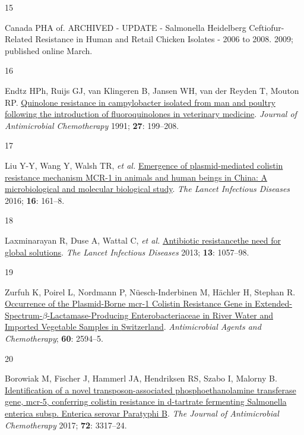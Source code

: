 \documentclass[
]{book}
\newlength{\cslhangindent}
\newlength{\csllabelwidth}
\newlength{\cslentryspacingunit} %
\newenvironment{CSLReferences}[2] %
 {%
  \setlength{\parindent}{0pt}
  \ifodd #1
  \let\oldpar\par
  \def\par{\hangindent=\cslhangindent\oldpar}
  \fi
  \setlength{\parskip}{#2\cslentryspacingunit}
 }%
 {}
\newcommand{\CSLLeftMargin}[1]{\parbox[t]{\csllabelwidth}{#1}}
\newcommand{\CSLRightInline}[1]{\parbox[t]{\linewidth - \csllabelwidth}{#1}\break}
\begin{document}
\begin{CSLReferences}{0}{0}
\leavevmode{}%
\CSLLeftMargin{15 }
\CSLRightInline{Canada PHA of. {ARCHIVED} - {UPDATE} - {Salmonella Heidelberg Ceftiofur-Related Resistance} in {Human} and {Retail Chicken Isolates} - 2006 to 2008. 2009; published online March.}

\leavevmode{}%
\CSLLeftMargin{16 }
\CSLRightInline{Endtz HPh, Ruijs GJ, van Klingeren B, Jansen WH, van der Reyden T, Mouton RP. \href{https://doi.org/10.1093/jac/27.2.199}{Quinolone resistance in campylobacter isolated from man and poultry following the introduction of fluoroquinolones in veterinary medicine}. \emph{Journal of Antimicrobial Chemotherapy} 1991; \textbf{27}: 199--208.}

\leavevmode{}%
\CSLLeftMargin{17 }
\CSLRightInline{Liu Y-Y, Wang Y, Walsh TR, \emph{et al.} \href{https://doi.org/10.1016/S1473-3099(15)00424-7}{Emergence of plasmid-mediated colistin resistance mechanism {MCR-1} in animals and human beings in {China}: A microbiological and molecular biological study}. \emph{The Lancet Infectious Diseases} 2016; \textbf{16}: 161--8.}

\leavevmode{}%
\CSLLeftMargin{18 }
\CSLRightInline{Laxminarayan R, Duse A, Wattal C, \emph{et al.} \href{https://doi.org/10.1016/S1473-3099(13)70318-9}{Antibiotic resistance\textemdash the need for global solutions}. \emph{The Lancet Infectious Diseases} 2013; \textbf{13}: 1057--98.}

\leavevmode{}%
\CSLLeftMargin{19 }
\CSLRightInline{Zurfuh K, Poirel L, Nordmann P, Nüesch-Inderbinen M, Hächler H, Stephan R. \href{https://doi.org/10.1128/AAC.00066-16}{Occurrence of the {Plasmid-Borne} mcr-1 {Colistin Resistance Gene} in {Extended-Spectrum-\(\beta\)-Lactamase-Producing Enterobacteriaceae} in {River Water} and {Imported Vegetable Samples} in {Switzerland}}. \emph{Antimicrobial Agents and Chemotherapy}; \textbf{60}: 2594--5.}

\leavevmode{}%
\CSLLeftMargin{20 }
\CSLRightInline{Borowiak M, Fischer J, Hammerl JA, Hendriksen RS, Szabo I, Malorny B. \href{https://doi.org/10.1093/jac/dkx327}{Identification of a novel transposon-associated phosphoethanolamine transferase gene, mcr-5, conferring colistin resistance in d-tartrate fermenting {Salmonella} enterica subsp. Enterica serovar {Paratyphi B}}. \emph{The Journal of Antimicrobial Chemotherapy} 2017; \textbf{72}: 3317--24.}


\end{CSLReferences}
\end{document}
